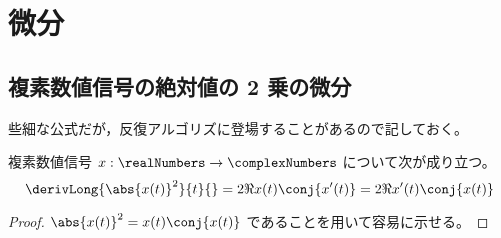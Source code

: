 \part{微分}
    \chapter{複素数値信号の絶対値の 2 乗の微分}
        些細な公式だが，反復アルゴリズに登場することがあるので記しておく。
        \begin{shadebox}
            複素数値信号 $x:\realNumbers\to\complexNumbers$ について次が成り立つ。
            \[ \derivLong{\abs{x(t)}^2}{t}{} = 2\Re{x(t)\conj{x'(t)}} = 2\Re{x'(t)\conj{x(t)}} \]
        \end{shadebox}
        \begin{proof}
            $\abs{x(t)}^2 = x(t)\conj{x(t)}$ であることを用いて容易に示せる。
        \end{proof}
